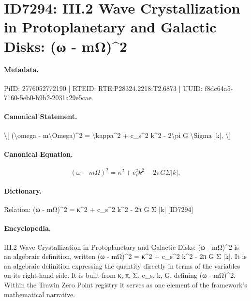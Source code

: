 \section*{ID7294: III.2 Wave Crystallization in Protoplanetary and Galactic Disks: (ω - mΩ)\textasciicircum{}2}
\paragraph{Metadata.}
PiID: 2776052772190 | RTEID: RTE:P28324.2218:T2.6873 | UUID: f8dc64a5-7160-5eb0-b9b2-2031a29e5cae

\paragraph{Canonical Statement.}
\textbackslash{}[ (\textbackslash{}omega - m\textbackslash{}Omega)\textasciicircum{}2 = \textbackslash{}kappa\textasciicircum{}2 + c\_s\textasciicircum{}2 k\textasciicircum{}2 - 2\textbackslash{}pi G \textbackslash{}Sigma |k|, \textbackslash{}]

\paragraph{Canonical Equation.}
\[
(\omega - m\Omega)^2 = \kappa^2 + c_s^2 k^2 - 2\pi G \Sigma |k|,
\]

\paragraph{Dictionary.}
Relation: (ω - mΩ)\textasciicircum{}2 = κ\textasciicircum{}2 + c\_s\textasciicircum{}2 k\textasciicircum{}2 - 2π G Σ |k| [ID7294]

\paragraph{Encyclopedia.}
III.2 Wave Crystallization in Protoplanetary and Galactic Disks: (ω - mΩ)\textasciicircum{}2 is an algebraic definition, written (ω - mΩ)\textasciicircum{}2 = κ\textasciicircum{}2 + c\_s\textasciicircum{}2 k\textasciicircum{}2 - 2π G Σ |k|. It is an algebraic definition expressing the quantity directly in terms of the variables on its right-hand side. It is built from κ, π, Σ, c\_s, k, G, defining (ω - mΩ)\textasciicircum{}2. Within the Trawin Zero Point registry it serves as one element of the framework's mathematical narrative.
